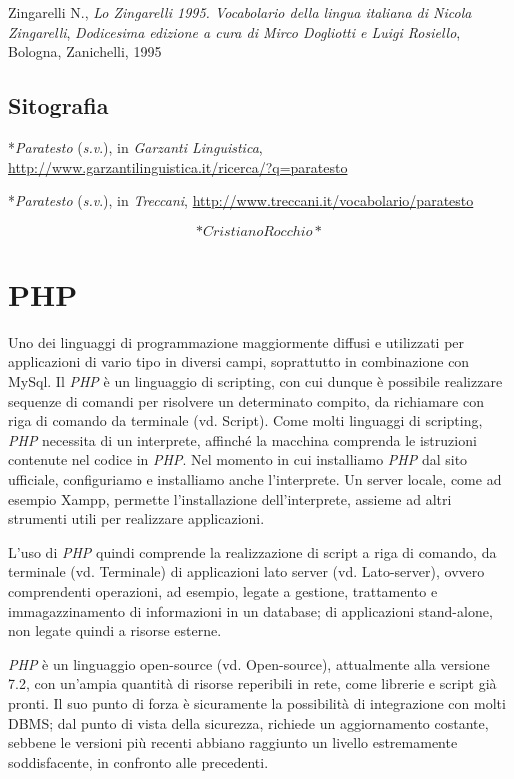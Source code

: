 \documentclass[
  b5paper,
  twoside,
  12pt,
  chapterprefix=false,
  bibliography=totocnumbered,
  parskip=false]{scrbook}
\begin{document}
Zingarelli N., \emph{Lo Zingarelli 1995. Vocabolario della lingua italiana di
Nicola Zingarelli}, \emph{Dodicesima edizione a cura di Mirco Dogliotti e
Luigi Rosiello}, Bologna, Zanichelli, 1995

\hypertarget{sitografia-26}{%
\section*{Sitografia}\label{sitografia-26}}

*\emph{Paratesto} (\emph{s.v}.), in \emph{Garzanti Linguistica},
\url{http://www.garzantilinguistica.it/ricerca/?q=paratesto}

*\emph{Paratesto} (\emph{s.v}.), in \emph{Treccani},
\url{http://www.treccani.it/vocabolario/paratesto}

\[*Cristiano Rocchio*\]

\hypertarget{php}{%
\chapter{PHP}\label{php}}

Uno dei linguaggi di programmazione maggiormente diffusi e utilizzati
per applicazioni di vario tipo in diversi campi, soprattutto in
combinazione con MySql. Il \emph{PHP} è un linguaggio di scripting, con cui
dunque è possibile realizzare sequenze di comandi per risolvere un
determinato compito, da richiamare con riga di comando da terminale (vd.
Script). Come molti linguaggi di scripting, \emph{PHP} necessita di un
interprete, affinché la macchina comprenda le istruzioni contenute nel
codice in \emph{PHP}. Nel momento in cui installiamo \emph{PHP} dal sito
ufficiale, configuriamo e installiamo anche l'interprete. Un server
locale, come ad esempio Xampp, permette l'installazione dell'interprete,
assieme ad altri strumenti utili per realizzare applicazioni.

L'uso di \emph{PHP} quindi comprende la realizzazione di script a riga di
comando, da terminale (vd. Terminale) di applicazioni lato server (vd.
Lato-server), ovvero comprendenti operazioni, ad esempio, legate a
gestione, trattamento e immagazzinamento di informazioni in un database;
di applicazioni stand-alone, non legate quindi a risorse esterne.

\emph{PHP} è un linguaggio open-source (vd. Open-source), attualmente alla
versione 7.2, con un'ampia quantità di risorse reperibili in rete, come
librerie e script già pronti. Il suo punto di forza è sicuramente la
possibilità di integrazione con molti DBMS; dal punto di vista della
sicurezza, richiede un aggiornamento costante, sebbene le versioni più
recenti abbiano raggiunto un livello estremamente soddisfacente, in
confronto alle precedenti.
\end{document}

